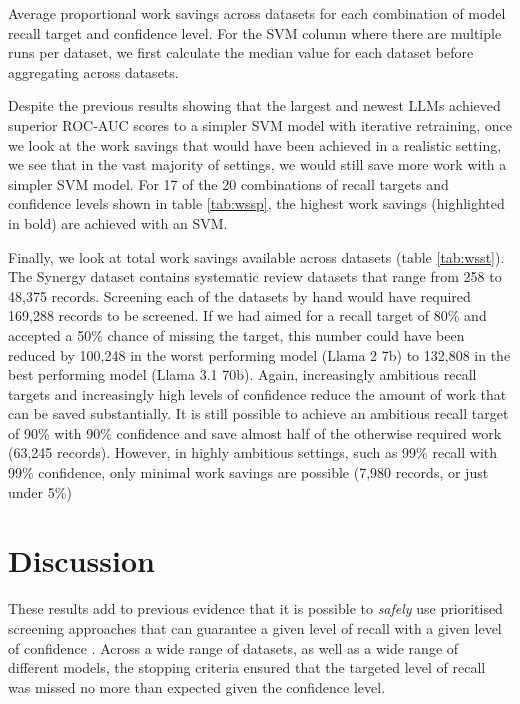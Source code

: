 \documentclass{article}
\begin{document}
	\begin{table}
		\centering
		
		\caption{Average proportional work savings across datasets for each combination of  model recall target and confidence level. For the SVM column where there are multiple runs per dataset, we first calculate the median value for each dataset before aggregating across datasets.}
		\label{tab:wsst}
	\end{table}
	
	Despite the previous results showing that the largest and newest LLMs achieved superior ROC-AUC scores to a simpler SVM model with iterative retraining, once we look at the work savings that would have been achieved in a realistic setting, we see that in the vast majority of settings, we would still save more work with a simpler SVM model. For 17 of the 20 combinations of recall targets and confidence levels shown in table \ref{tab:wssp}, the highest work savings (highlighted in bold) are achieved with an SVM.
	
	Finally, we look at total work savings available across datasets (table \ref{tab:wsst}). The Synergy dataset contains systematic review datasets that range from 258 to 48,375 records. 
	Screening each of the datasets by hand would have required 169,288 records to be screened.	
	If we had aimed for a recall target of 80\% and accepted a 50\% chance of missing the target, this number could have been reduced by 100,248 in the worst performing model (Llama 2 7b) to 132,808 in the best performing model (Llama 3.1 70b).
	Again, increasingly ambitious recall targets and increasingly high levels of confidence reduce the amount of work that can be saved substantially. It is still possible to achieve an ambitious recall target of 90\% with 90\% confidence and save almost half of the otherwise required work (63,245 records). However, in highly ambitious settings, such as 99\% recall with 99\% confidence, only minimal work savings are possible (7,980 records, or just under 5\%)

	
	\section*{Discussion}
	
	These results add to previous evidence that it is possible to \textit{safely} use prioritised screening approaches that can guarantee a given level of recall with a given level of confidence \cite{callaghan_statistical_2020}. Across a wide range of datasets, as well as a wide range of different models, the stopping criteria ensured that the targeted level of recall was missed no more than expected given the confidence level.
	
\end{document}
